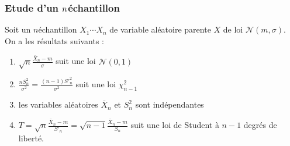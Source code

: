 \documentclass[letterpaper,10pt,english]{jupyterBook}
\begin{document}
\subsubsection{Etude d’un \protect\(n\protect\)\sphinxhyphen{}échantillon}
\label{\detokenize{elemstats:etude-d-un-n-echantillon}}
\sphinxAtStartPar
Soit un \(n\)\sphinxhyphen{}échantillon \(X_1\cdots X_n\) de variable aléatoire parente \(X\) de loi \(\mathcal{N}(m,\sigma)\). On a les résultats suivants :
\begin{enumerate}
%
\item {} 
\sphinxAtStartPar
\(\sqrt{n} \frac{\bar{X}_n-m}{\sigma}\) suit une loi \(\mathcal{N}(0,1)\)

\item {} 
\sphinxAtStartPar
\(\frac{nS_n^2}{\sigma^2} = \frac{(n-1)S'^2_n}{\sigma^2}\) suit une loi \(\chi^2_{n-1}\)

\item {} 
\sphinxAtStartPar
les variables aléatoires \(\bar{X}_n\) et \(S_n^2\) sont indépendantes

\item {} 
\sphinxAtStartPar
\(T=\sqrt{n}\frac{\bar{X}_n-m}{S'_n}=\sqrt{n-1}\frac{\bar{X}_n-m}{S_n}\) suit une loi de Student à \(n-1\) degrés de liberté.

\end{enumerate}
\end{document}
